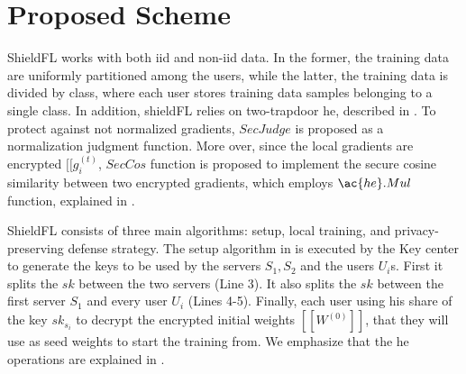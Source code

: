 \section{Proposed Scheme}
\label{sec:proposed-scheme}


ShieldFL works with both \ac{iid} and non-\ac{iid} data.
In the former, the training data are uniformly partitioned among the users, while the latter, the training data is divided by class, where each user stores training data samples belonging to a single class.
In addition, shieldFL relies on two-trapdoor \ac{he}, described in .
To protect against not normalized gradients, $SecJudge$ is proposed as a normalization judgment function.
More over, since the local gradients are encrypted $[[g_i^{(t)}$, $SecCos$ function is proposed to implement the secure cosine similarity between two encrypted gradients, which employs $\ac{he}.Mul$ function, explained in .


ShieldFL consists of three main algorithms: setup, local training, and privacy-preserving defense strategy.
The setup algorithm in  is executed by the Key center to generate the keys to be used by the servers $S_1, S_2$ and the users $U_i$s.
First it splits the $sk$ between the two servers (Line 3).
It also splits the $sk$ between the first server $S_1$ and every user $U_i$ (Lines 4-5).
Finally, each user using his share of the key $sk_{s_i}$ to decrypt the encrypted initial weights $[[W^{(0)}]]$, that they will use as seed weights to start the training from.
We emphasize that the \ac{he} operations are explained in .

